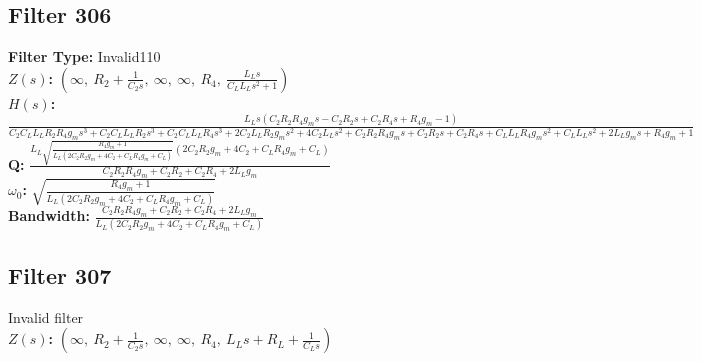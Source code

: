 \documentclass{article}
\begin{document}
\subsection*{Filter 306}
\textbf{Filter Type:} Invalid110 \\ 
\textbf{$Z(s)$:} $\left( \infty, \  R_{2} + \frac{1}{C_{2} s}, \  \infty, \  \infty, \  R_{4}, \  \frac{L_{L} s}{C_{L} L_{L} s^{2} + 1}\right)$ \\ 
\textbf{$H(s)$:} $\frac{L_{L} s \left(C_{2} R_{2} R_{4} g_{m} s - C_{2} R_{2} s + C_{2} R_{4} s + R_{4} g_{m} - 1\right)}{C_{2} C_{L} L_{L} R_{2} R_{4} g_{m} s^{3} + C_{2} C_{L} L_{L} R_{2} s^{3} + C_{2} C_{L} L_{L} R_{4} s^{3} + 2 C_{2} L_{L} R_{2} g_{m} s^{2} + 4 C_{2} L_{L} s^{2} + C_{2} R_{2} R_{4} g_{m} s + C_{2} R_{2} s + C_{2} R_{4} s + C_{L} L_{L} R_{4} g_{m} s^{2} + C_{L} L_{L} s^{2} + 2 L_{L} g_{m} s + R_{4} g_{m} + 1}$ \\ 
\textbf{Q:} $\frac{L_{L} \sqrt{\frac{R_{4} g_{m} + 1}{L_{L} \left(2 C_{2} R_{2} g_{m} + 4 C_{2} + C_{L} R_{4} g_{m} + C_{L}\right)}} \left(2 C_{2} R_{2} g_{m} + 4 C_{2} + C_{L} R_{4} g_{m} + C_{L}\right)}{C_{2} R_{2} R_{4} g_{m} + C_{2} R_{2} + C_{2} R_{4} + 2 L_{L} g_{m}}$ \\ 
\textbf{$\omega_0$:} $\sqrt{\frac{R_{4} g_{m} + 1}{L_{L} \left(2 C_{2} R_{2} g_{m} + 4 C_{2} + C_{L} R_{4} g_{m} + C_{L}\right)}}$ \\ 
\textbf{Bandwidth:} $\frac{C_{2} R_{2} R_{4} g_{m} + C_{2} R_{2} + C_{2} R_{4} + 2 L_{L} g_{m}}{L_{L} \left(2 C_{2} R_{2} g_{m} + 4 C_{2} + C_{L} R_{4} g_{m} + C_{L}\right)}$ \\ 
\subsection*{Filter 307}
Invalid filter \\ 
\textbf{$Z(s)$:} $\left( \infty, \  R_{2} + \frac{1}{C_{2} s}, \  \infty, \  \infty, \  R_{4}, \  L_{L} s + R_{L} + \frac{1}{C_{L} s}\right)$ \\ 
\end{document}
